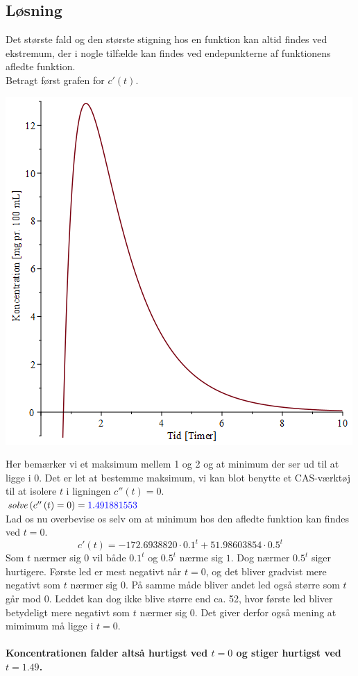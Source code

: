 \documentclass[a4paper, 11pt]{article}
\begin{document}
\subsection*{Løsning}
Det største fald og den største stigning hos en funktion kan altid findes ved ekstremum, der i nogle tilfælde kan findes ved endepunkterne af funktionens afledte funktion.\\
Betragt først grafen for \(c'(t)\).\\
\begin{center}
\includegraphics[width = 0.65 \textwidth]{AfledtGraf.png}
\end{center}
Her bemærker vi et maksimum mellem 1 og 2 og at minimum der ser ud til at ligge i 0. Det er let at bestemme maksimum, vi kan blot benytte et CAS-værktøj til at isolere \(t\) i ligningen \(c''(t)=0\).\\
\(\mathit{solve}\left(c''\left(t\right)=0\right)=\textcolor{blue}{1.491881553}\)\\
Lad os nu overbevise os selv om at minimum hos den afledte funktion kan findes ved \(t=0\). 
\[c'(t)=- 172.6938820 \cdot 0.1^{t}+ 51.98603854 \cdot 0.5^{t}\]
Som \(t\) nærmer sig \(0\) vil både \(0.1^t\) og \(0.5^t\) nærme sig \(1\). Dog nærmer \(0.5^t\) siger hurtigere. Første led er mest negativt når \(t=0\), og det bliver gradvist mere negativt som \(t\) nærmer sig 0. På samme måde bliver andet led også større som \(t\) går mod 0. Leddet kan dog ikke blive større end ca. 52, hvor første led bliver betydeligt mere negativt som \(t\) nærmer sig 0. Det giver derfor også mening at mimimum må ligge i \(t=0\).\\\\
\textbf{Koncentrationen falder altså hurtigst ved \(t=0\) og stiger hurtigst ved \(t=1.49\).}
\end{document}
